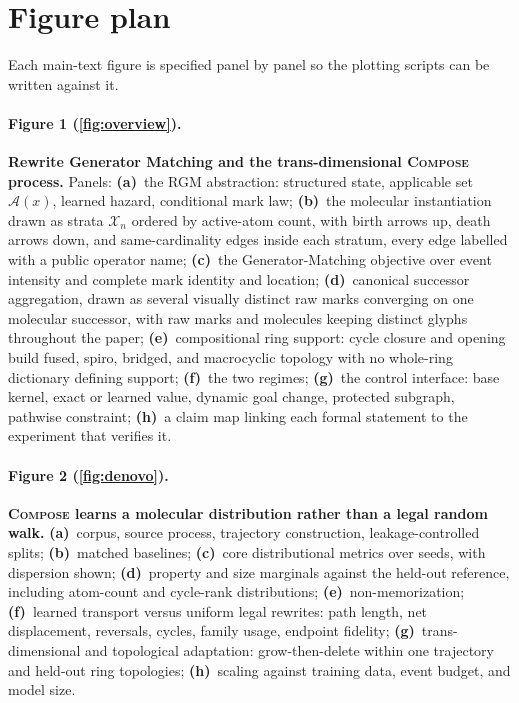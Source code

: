\documentclass{article}
\newcommand{\method}{\textsc{Compose}\xspace}
\newcommand{\rgm}{\textsc{RGM}\xspace}
\newcommand{\A}{\mathcal{A}}
\newcommand{\X}{\mathcal{X}}
\theoremstyle{definition}
\theoremstyle{remark}
\begin{document}



\appendix


\section{Figure plan}\label{app:figplan}

Each main-text figure is specified panel by panel so the plotting scripts can be written against it.

\paragraph{Figure 1 (\cref{fig:overview}).}
\textbf{Rewrite Generator Matching and the trans-dimensional \method process.} Panels: \textbf{(a)}~the \rgm abstraction: structured state, applicable set $\A(x)$, learned hazard, conditional mark law; \textbf{(b)}~the molecular instantiation drawn as strata $\X_n$ ordered by active-atom count, with birth arrows up, death arrows down, and same-cardinality edges inside each stratum, every edge labelled with a public operator name; \textbf{(c)}~the Generator-Matching objective over event intensity and complete mark identity and location; \textbf{(d)}~canonical successor aggregation, drawn as several visually distinct raw marks converging on one molecular successor, with raw marks and molecules keeping distinct glyphs throughout the paper; \textbf{(e)}~compositional ring support: cycle closure and opening build fused, spiro, bridged, and macrocyclic topology with no whole-ring dictionary defining support; \textbf{(f)}~the two regimes; \textbf{(g)}~the control interface: base kernel, exact or learned value, dynamic goal change, protected subgraph, pathwise constraint; \textbf{(h)}~a claim map linking each formal statement to the experiment that verifies it.

\paragraph{Figure 2 (\cref{fig:denovo}).}
\textbf{\method learns a molecular distribution rather than a legal random walk.} \textbf{(a)}~corpus, source process, trajectory construction, leakage-controlled splits; \textbf{(b)}~matched baselines; \textbf{(c)}~core distributional metrics over seeds, with dispersion shown; \textbf{(d)}~property and size marginals against the held-out reference, including atom-count and cycle-rank distributions; \textbf{(e)}~non-memorization; \textbf{(f)}~learned transport versus uniform legal rewrites: path length, net displacement, reversals, cycles, family usage, endpoint fidelity; \textbf{(g)}~trans-dimensional and topological adaptation: grow-then-delete within one trajectory and held-out ring topologies; \textbf{(h)}~scaling against training data, event budget, and model size.
\end{document}
